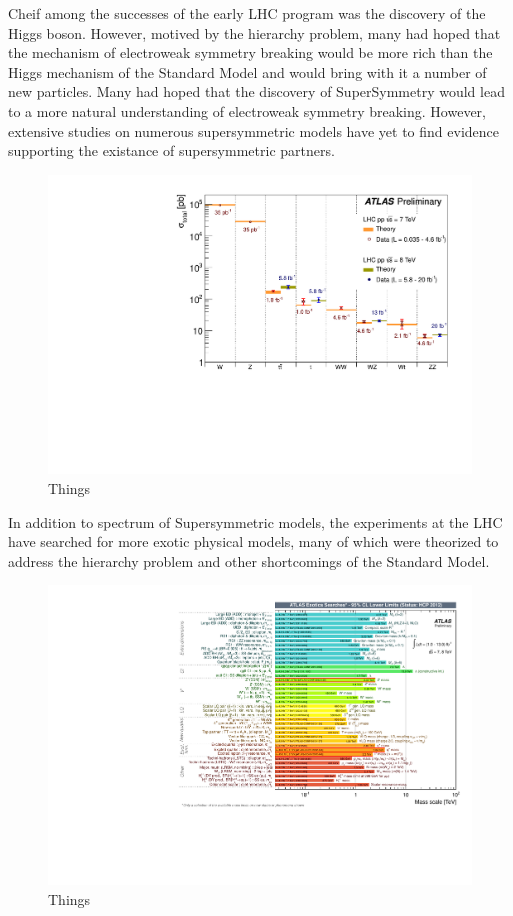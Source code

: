 Cheif among the successes of the early LHC program was the discovery of the Higgs boson.
However, motived by the hierarchy problem, many had hoped that the mechanism of electroweak
symmetry breaking would be more rich than the Higgs mechanism of the Standard Model and
would bring with it a number of new particles.
Many had hoped that the discovery of SuperSymmetry would lead to a more natural understanding
of electroweak symmetry breaking.
However, extensive studies on numerous supersymmetric models have yet to find evidence
supporting the existance of supersymmetric partners.

\begin{figure}[ht!]
  \begin{center}
    \includegraphics[width=.75\textwidth]{figures/conclusion/SM_SummaryPlotMoriondEWK2013}
    \caption{Things}
    \label{fig:xsec_vs_roots}
  \end{center}
\end{figure}
\clearpage

In addition to spectrum of Supersymmetric models, the experiments at the LHC have searched
for more exotic physical models, many of which were theorized to address the hierarchy
problem and other shortcomings of the Standard Model.

\begin{figure}[ht!]
  \begin{center}
    \includegraphics[width=.75\textwidth]{figures/conclusion/ExoticResultsSummary}
    \caption{Things}
    \label{fig:xsec_vs_roots}
  \end{center}
\end{figure}

